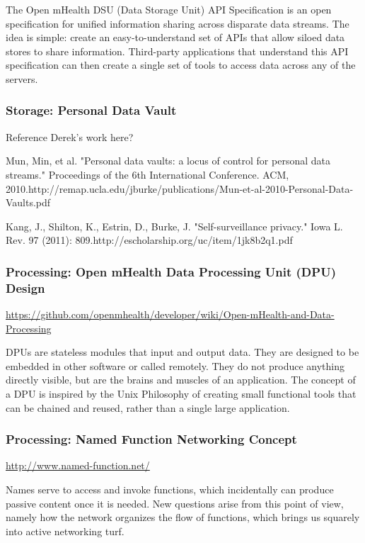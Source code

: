 The Open mHealth DSU (Data Storage Unit) API Specification is an open specification for unified information sharing across disparate data streams. The idea is simple: create an easy-to-understand set of APIs that allow siloed data stores to share information. Third-party applications that understand this API specification can then create a single set of tools to access data across any of the servers.


\subsubsection{Storage: Personal Data Vault} 

Reference Derek's work here? 

Mun, Min, et al. "Personal data vaults: a locus of control for personal data streams." Proceedings of the 6th International Conference. ACM, 2010.http://remap.ucla.edu/jburke/publications/Mun-et-al-2010-Personal-Data-Vaults.pdf

Kang, J., Shilton, K., Estrin, D., Burke, J. "Self-surveillance privacy." Iowa L. Rev. 97 (2011): 809.http://escholarship.org/uc/item/1jk8b2q1.pdf

\subsubsection{Processing: Open mHealth Data Processing Unit (DPU) Design}

\url{https://github.com/openmhealth/developer/wiki/Open-mHealth-and-Data-Processing}

DPUs are stateless modules that input and output data. They are designed to be embedded in other software or called remotely. They do not produce anything directly visible, but are the brains and muscles of an application. The concept of a DPU is inspired by the Unix Philosophy of creating small functional tools that can be chained and reused, rather than a single large application.

\subsubsection{Processing: Named Function Networking Concept}

\url{http://www.named-function.net/}

Names serve to access and invoke functions, which incidentally can produce passive content once it is needed. New questions arise from this point of view, namely how the network organizes the flow of functions, which brings us squarely into active networking turf. 

